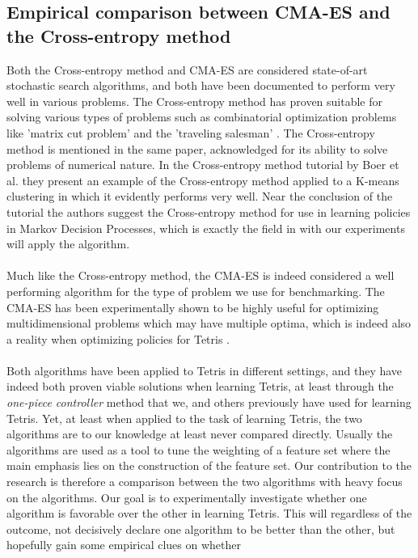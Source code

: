 \subsection{Empirical comparison between CMA-ES and the Cross-entropy method}

Both the Cross-entropy method and CMA-ES are considered state-of-art
stochastic search algorithms, and both have been documented to perform very well
in various problems. The Cross-entropy method has proven 
suitable for solving various types of problems such as 
combinatorial optimization problems like 'matrix cut problem'
and the 'traveling salesman' \citep{cetut2014}. 
The Cross-entropy method is mentioned in the same paper, acknowledged for
its ability to solve problems of numerical nature. In the 
Cross-entropy method tutorial by Boer et al. they present 
an example of the Cross-entropy method applied to 
a K-means clustering in which it evidently performs very well.
Near the conclusion of the tutorial the authors suggest the 
Cross-entropy method for use in learning policies in Markov Decision 
Processes, which is exactly the field in with our experiments will apply the
algorithm.\\
\\
Much like the Cross-entropy method, the CMA-ES is indeed considered
a well performing algorithm for the type of problem we use for benchmarking.
The CMA-ES has been experimentally shown to be highly useful for optimizing multidimensional
problems which may have multiple optima, which is indeed also a reality when 
optimizing policies for Tetris \citep{hansen2004}.\\
\\
Both algorithms have been applied to Tetris in different settings, and they have
indeed both proven viable solutions when learning Tetris, at least through the
\textit{one-piece controller} method that we, and others previously have used
for learning Tetris. Yet, at least when applied to the task of learning Tetris,
the two algorithms are to our knowledge at least never compared directly. Usually
the algorithms are used as a tool to tune the weighting of a feature set where the
main emphasis lies on the construction of the feature set. Our contribution to 
the research is therefore a comparison between the two algorithms
with heavy focus on the algorithms. Our goal is to experimentally investigate
whether one algorithm is favorable over the other in learning Tetris.
This will regardless of the outcome, not decisively declare one algorithm 
to be better than the other, but hopefully gain some empirical clues on whether 
